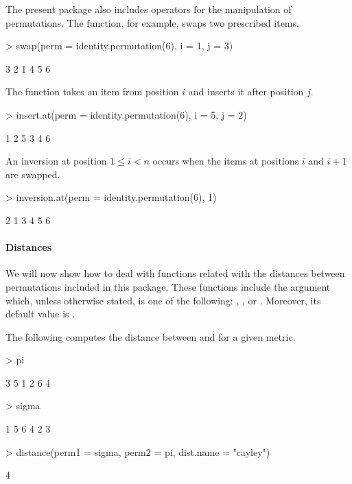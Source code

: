 \documentclass[article,nojss]{jss}
\begin{document}
The present package also includes operators for the manipulation of permutations. The  function, for example, swaps two prescribed items. 
\begin{Schunk}
\begin{Sinput}
> swap(perm = identity.permutation(6), i = 1, j = 3)
\end{Sinput}
\begin{Soutput}
[1] 3 2 1 4 5 6
\end{Soutput}
\end{Schunk}

The  function takes an item from position $i$ and inserts it after position $j$. 
\begin{Schunk}
\begin{Sinput}
> insert.at(perm = identity.permutation(6), i = 5, j = 2)
\end{Sinput}
\begin{Soutput}
[1] 1 2 5 3 4 6
\end{Soutput}
\end{Schunk}

An inversion at position $1 \leq i < n$ occurs when the items at positions $i$ and $i+1$ are swapped. 
\begin{Schunk}
\begin{Sinput}
> inversion.at(perm = identity.permutation(6), 1)
\end{Sinput}
\begin{Soutput}
[1] 2 1 3 4 5 6
\end{Soutput}
\end{Schunk}

\paragraph{Distances}
We will now show how to deal with functions related with the distances between permutations included in this package. These functions include the argument  which, unless otherwise stated, is one of the following: , ,  or . Moreover, its default value is .

The following computes the distance between  and  for a given metric. 
\begin{Schunk}
\begin{Sinput}
> pi
\end{Sinput}
\begin{Soutput}
[1] 3 5 1 2 6 4
\end{Soutput}
\begin{Sinput}
> sigma
\end{Sinput}
\begin{Soutput}
[1] 1 5 6 4 2 3
\end{Soutput}
\begin{Sinput}
> distance(perm1 = sigma, perm2 = pi, dist.name = "cayley")
\end{Sinput}
\begin{Soutput}
[1] 4
\end{Soutput}
\end{Schunk}
\end{document}
